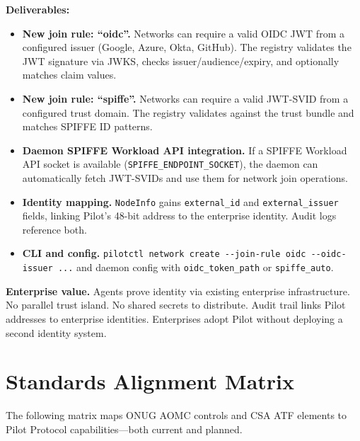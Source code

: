 \documentclass[11pt,a4paper]{article}
\begin{document}
\textbf{Deliverables:}
\begin{itemize}
    \item \textbf{New join rule: ``oidc''.} Networks can require a valid OIDC JWT from a configured issuer (Google, Azure, Okta, GitHub). The registry validates the JWT signature via JWKS, checks issuer/audience/expiry, and optionally matches claim values.
    \item \textbf{New join rule: ``spiffe''.} Networks can require a valid JWT-SVID from a configured trust domain. The registry validates against the trust bundle and matches SPIFFE ID patterns.
    \item \textbf{Daemon SPIFFE Workload API integration.} If a SPIFFE Workload API socket is available (\texttt{SPIFFE\_ENDPOINT\_SOCKET}), the daemon can automatically fetch JWT-SVIDs and use them for network join operations.
    \item \textbf{Identity mapping.} \texttt{NodeInfo} gains \texttt{external\_id} and \texttt{external\_issuer} fields, linking Pilot's 48-bit address to the enterprise identity. Audit logs reference both.
    \item \textbf{CLI and config.} \texttt{pilotctl network create -{}-join-rule oidc -{}-oidc-issuer ...} and daemon config with \texttt{oidc\_token\_path} or \texttt{spiffe\_auto}.
\end{itemize}

\textbf{Enterprise value.} Agents prove identity via existing enterprise infrastructure. No parallel trust island. No shared secrets to distribute. Audit trail links Pilot addresses to enterprise identities. Enterprises adopt Pilot without deploying a second identity system.

\section{Standards Alignment Matrix}

The following matrix maps ONUG AOMC controls and CSA ATF elements to Pilot Protocol capabilities---both current and planned.
\end{document}
